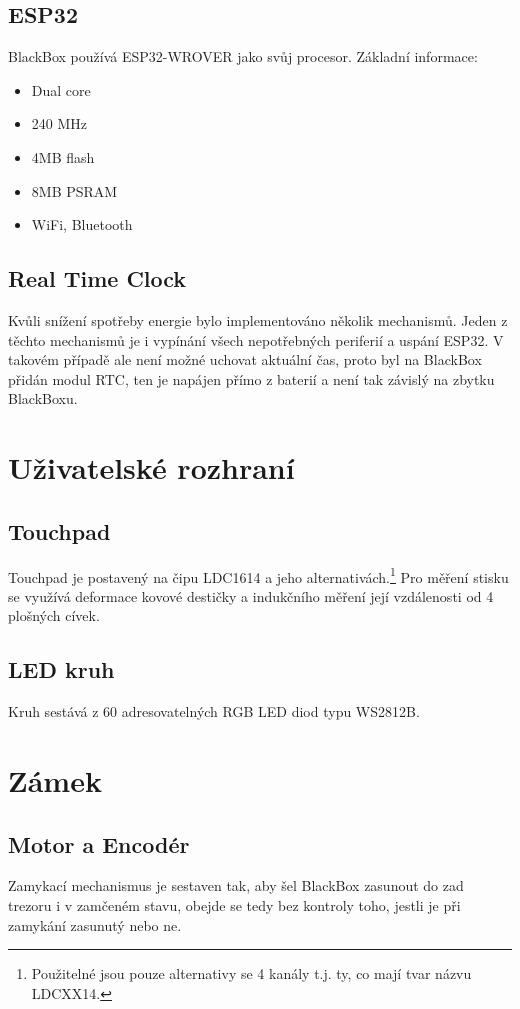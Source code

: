 \subsection{ESP32}
BlackBox používá ESP32-WROVER jako svůj procesor.
Základní informace:
\begin{itemize}
    \item Dual core
    \item 240 MHz
    \item 4MB flash
    \item 8MB PSRAM
    \item WiFi, Bluetooth
\end{itemize}

\subsection{Real Time Clock}
Kvůli snížení spotřeby energie bylo implementováno několik mechanismů.
Jeden z těchto mechanismů je i vypínání všech nepotřebných periferií a uspání ESP32. V takovém případě ale není možné uchovat aktuální čas, proto byl na BlackBox přidán modul RTC, ten je napájen přímo z baterií a není tak závislý na zbytku BlackBoxu.

\section{Uživatelské rozhraní}

\subsection{Touchpad}
Touchpad je postavený na čipu LDC1614 a jeho alternativách.\footnote{Použitelné jsou pouze alternativy se 4 kanály t.j. ty, co mají tvar názvu LDCXX14.}
Pro měření stisku se využívá deformace kovové destičky a indukčního měření její vzdálenosti od 4 plošných cívek.

\subsection{LED kruh}
Kruh sestává z 60 adresovatelných RGB LED diod typu WS2812B.

\section{Zámek}

\subsection{Motor a Encodér}
Zamykací mechanismus je sestaven tak, aby šel BlackBox zasunout do zad trezoru i v zamčeném stavu, obejde se tedy bez kontroly toho, jestli je při zamykání zasunutý nebo ne.

